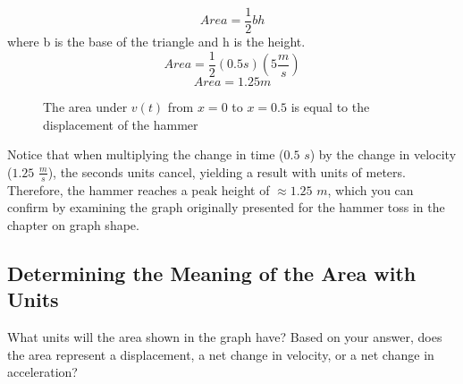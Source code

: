 $$Area=\frac{1}{2}bh$$where b is the base of the triangle and h is the height. 
$$Area=\frac{1}{2}(0.5s)(5\frac{m}{s})$$
$$Area=1.25m$$


\begin{figure}[htbp]
	\centering
	\caption{The area under $v(t)$ from $x=0$ to $x=0.5$ is equal to the displacement of the hammer}
	\label{fig:hammerarea}
\end{figure}

Notice that when multiplying the change in time ($0.5$ $s$) by the change in velocity ($1.25$ $\frac{m}{s}$), the seconds units cancel, yielding a result with units of meters. Therefore, the hammer reaches a peak height of $\approx1.25$ $m$, which you can confirm by examining the graph originally presented for the hammer toss in the chapter on graph shape.

\subsection{Determining the Meaning of the Area with Units}

\begin{Exercise}[label=units1]
What units will the area shown in the graph have? Based on your answer, does the area represent a displacement, a net change in velocity, or a net change in acceleration?\\
\end{Exercise}


